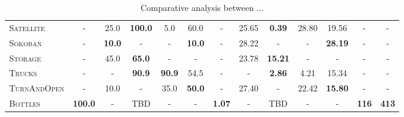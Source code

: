 \documentclass[11pt,landscape]{article}
\begin{document}
\begin{table*}[tb]
{\begin{tabular}{|l||ccccc||ccccc||c||c||}
\textsc{Satellite}&-&25.0&\textbf{100.0}&5.0&60.0&-&25.65&\textbf{0.39}&28.80&19.56&-&-\\
\textsc{Sokoban}&-&\textbf{10.0}&-&-&\textbf{10.0}&-&28.22&-&-&\textbf{28.19}&-&-\\
\textsc{Storage}&-&45.0&\textbf{65.0}&-&-&-&23.78&\textbf{15.21}&-&-&-&-\\
\textsc{Trucks}&-&-&\textbf{90.9}&\textbf{90.9}&54.5&-&-&\textbf{2.86}&4.21&15.34&-&-\\
\textsc{TurnAndOpen}&-&10.0&-&35.0&\textbf{50.0}&-&27.40&-&22.42&\textbf{15.80}&-&-\\
\textsc{Bottles}&\textbf{100.0}&-&TBD&-&-&\textbf{1.07}&-&TBD&-&-&\textbf{116}&\textbf{413}
\\\hline

        \end{tabular}}
        \caption{Comparative analysis between ...}
        \label{tab:experiments}
        \end{table*}
        
\end{document}
